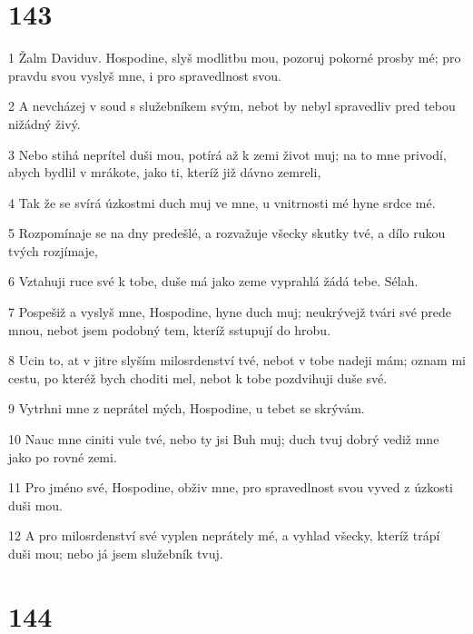 \chapter{143}

\par 1 Žalm Daviduv. Hospodine, slyš modlitbu mou, pozoruj pokorné prosby mé; pro pravdu svou vyslyš mne, i pro spravedlnost svou.
\par 2 A nevcházej v soud s služebníkem svým, nebot by nebyl spravedliv pred tebou nižádný živý.
\par 3 Nebo stihá neprítel duši mou, potírá až k zemi život muj; na to mne privodí, abych bydlil v mrákote, jako ti, kteríž již dávno zemreli,
\par 4 Tak že se svírá úzkostmi duch muj ve mne, u vnitrnosti mé hyne srdce mé.
\par 5 Rozpomínaje se na dny predešlé, a rozvažuje všecky skutky tvé, a dílo rukou tvých rozjímaje,
\par 6 Vztahuji ruce své k tobe, duše má jako zeme vyprahlá žádá tebe. Sélah.
\par 7 Pospešiž a vyslyš mne, Hospodine, hyne duch muj; neukrývejž tvári své prede mnou, nebot jsem podobný tem, kteríž sstupují do hrobu.
\par 8 Ucin to, at v jitre slyším milosrdenství tvé, nebot v tobe nadeji mám; oznam mi cestu, po kteréž bych choditi mel, nebot k tobe pozdvihuji duše své.
\par 9 Vytrhni mne z neprátel mých, Hospodine, u tebet se skrývám.
\par 10 Nauc mne ciniti vule tvé, nebo ty jsi Buh muj; duch tvuj dobrý vediž mne jako po rovné zemi.
\par 11 Pro jméno své, Hospodine, obživ mne, pro spravedlnost svou vyved z úzkosti duši mou.
\par 12 A pro milosrdenství své vyplen neprátely mé, a vyhlad všecky, kteríž trápí duši mou; nebo já jsem služebník tvuj.

\chapter{144}

